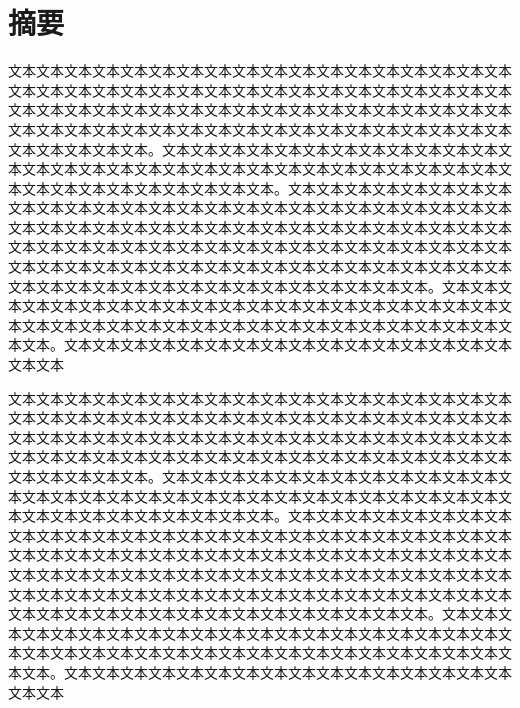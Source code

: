 \chapter*{摘\quad  要}
\newcommand{\keywords}[1]{\text{\heiti #1}}
\vspace*{0.5\baselineskip}

文本文本文本文本文本文本文本文本文本文本文本文本文本文本文本文本文本文本文本文本文本文本文本文本文本文本文本文本文本文本文本文本文本文本文本文本文本文本文本文本文本文本文本文本文本文本文本文本文本文本文本文本文本文本文本文本文本文本文本文本文本文本文本文本文本文本文本文本文本文本文本文本文本文本文本文本文本。文本文本文本文本文本文本文本文本文本文本文本文本文本文本文本文本文本文本文本文本文本文本文本文本文本文本文本文本文本文本文本文本文本文本文本文本文本文本文本文本。文本文本文本文本文本文本文本文本文本文本文本文本文本文本文本文本文本文本文本文本文本文本文本文本文本文本文本文本文本文本文本文本文本文本文本文本文本文本文本文本文本文本文本文本文本文本文本文本文本文本文本文本文本文本文本文本文本文本文本文本文本文本文本文本文本文本文本文本文本文本文本文本文本文本文本文本文本文本文本文本文本文本文本文本文本文本文本文本文本文本文本文本文本文本文本。文本文本文本文本文本文本文本文本文本文本文本文本文本文本文本文本文本文本文本文本文本文本文本文本文本文本文本文本文本文本文本文本文本文本文本文本文本文本文本文本。文本文本文本文本文本文本文本文本文本文本文本文本文本文本文本文本文本文本

文本文本文本文本文本文本文本文本文本文本文本文本文本文本文本文本文本文本文本文本文本文本文本文本文本文本文本文本文本文本文本文本文本文本文本文本文本文本文本文本文本文本文本文本文本文本文本文本文本文本文本文本文本文本文本文本文本文本文本文本文本文本文本文本文本文本文本文本文本文本文本文本文本文本文本文本文本。文本文本文本文本文本文本文本文本文本文本文本文本文本文本文本文本文本文本文本文本文本文本文本文本文本文本文本文本文本文本文本文本文本文本文本文本文本文本文本文本。文本文本文本文本文本文本文本文本文本文本文本文本文本文本文本文本文本文本文本文本文本文本文本文本文本文本文本文本文本文本文本文本文本文本文本文本文本文本文本文本文本文本文本文本文本文本文本文本文本文本文本文本文本文本文本文本文本文本文本文本文本文本文本文本文本文本文本文本文本文本文本文本文本文本文本文本文本文本文本文本文本文本文本文本文本文本文本文本文本文本文本文本文本文本文本。文本文本文本文本文本文本文本文本文本文本文本文本文本文本文本文本文本文本文本文本文本文本文本文本文本文本文本文本文本文本文本文本文本文本文本文本文本文本文本文本。文本文本文本文本文本文本文本文本文本文本文本文本文本文本文本文本文本文本

